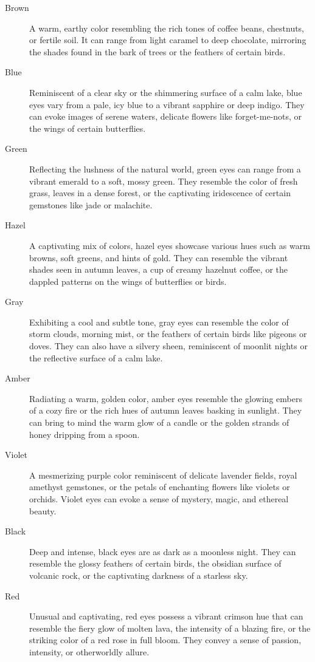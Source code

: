 \documentclass[12pt]{book}  %
\begin{document}
\begin{description}
    \item[Brown] A warm, earthy color resembling the rich tones of coffee beans, chestnuts, or fertile soil. It can range from light caramel to deep chocolate, mirroring the shades found in the bark of trees or the feathers of certain birds.
    \item[Blue] Reminiscent of a clear sky or the shimmering surface of a calm lake, blue eyes vary from a pale, icy blue to a vibrant sapphire or deep indigo. They can evoke images of serene waters, delicate flowers like forget-me-nots, or the wings of certain butterflies.
    \item[Green] Reflecting the lushness of the natural world, green eyes can range from a vibrant emerald to a soft, mossy green. They resemble the color of fresh grass, leaves in a dense forest, or the captivating iridescence of certain gemstones like jade or malachite.
    \item[Hazel] A captivating mix of colors, hazel eyes showcase various hues such as warm browns, soft greens, and hints of gold. They can resemble the vibrant shades seen in autumn leaves, a cup of creamy hazelnut coffee, or the dappled patterns on the wings of butterflies or birds.
    \item[Gray] Exhibiting a cool and subtle tone, gray eyes can resemble the color of storm clouds, morning mist, or the feathers of certain birds like pigeons or doves. They can also have a silvery sheen, reminiscent of moonlit nights or the reflective surface of a calm lake.
    \item[Amber] Radiating a warm, golden color, amber eyes resemble the glowing embers of a cozy fire or the rich hues of autumn leaves basking in sunlight. They can bring to mind the warm glow of a candle or the golden strands of honey dripping from a spoon.
    \item[Violet] A mesmerizing purple color reminiscent of delicate lavender fields, royal amethyst gemstones, or the petals of enchanting flowers like violets or orchids. Violet eyes can evoke a sense of mystery, magic, and ethereal beauty.
    \item[Black] Deep and intense, black eyes are as dark as a moonless night. They can resemble the glossy feathers of certain birds, the obsidian surface of volcanic rock, or the captivating darkness of a starless sky.
    \item[Red] Unusual and captivating, red eyes possess a vibrant crimson hue that can resemble the fiery glow of molten lava, the intensity of a blazing fire, or the striking color of a red rose in full bloom. They convey a sense of passion, intensity, or otherworldly allure.

\end{description}
\end{document}
